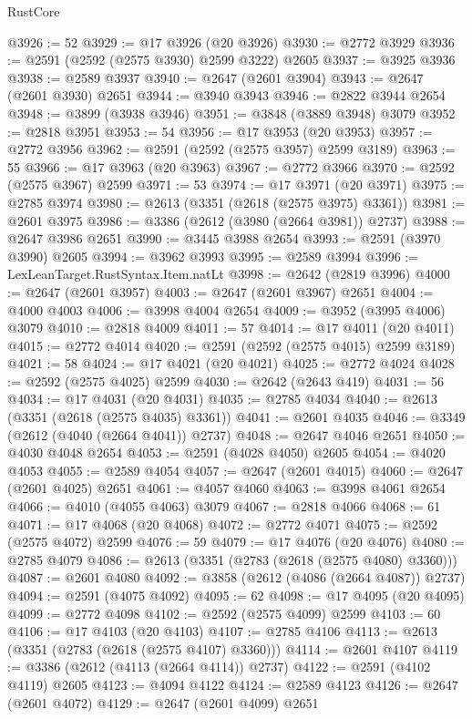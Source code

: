 \begin{lexlean}{RustCore}
\begin{coremodule}
@3926 := 52
@3929 := @17 @3926 (@20 @3926)
@3930 := @2772 @3929
@3936 := @2591 (@2592 (@2575 @3930) @2599 @3222) @2605
@3937 := @3925 @3936
@3938 := @2589 @3937
@3940 := @2647 (@2601 @3904)
@3943 := @2647 (@2601 @3930) @2651
@3944 := @3940 @3943
@3946 := @2822 @3944 @2654
@3948 := @3899 (@3938 @3946)
@3951 := @3848 (@3889 @3948) @3079
@3952 := @2818 @3951
@3953 := 54
@3956 := @17 @3953 (@20 @3953)
@3957 := @2772 @3956
@3962 := @2591 (@2592 (@2575 @3957) @2599 @3189)
@3963 := 55
@3966 := @17 @3963 (@20 @3963)
@3967 := @2772 @3966
@3970 := @2592 (@2575 @3967) @2599
@3971 := 53
@3974 := @17 @3971 (@20 @3971)
@3975 := @2785 @3974
@3980 := @2613 (@3351 (@2618 (@2575 @3975) @3361))
@3981 := @2601 @3975
@3986 := @3386 (@2612 (@3980 (@2664 @3981)) @2737)
@3988 := @2647 @3986 @2651
@3990 := @3445 @3988 @2654
@3993 := @2591 (@3970 @3990) @2605
@3994 := @3962 @3993
@3995 := @2589 @3994
@3996 := LexLeanTarget.RustSyntax.Item.natLt
@3998 := @2642 (@2819 @3996)
@4000 := @2647 (@2601 @3957)
@4003 := @2647 (@2601 @3967) @2651
@4004 := @4000 @4003
@4006 := @3998 @4004 @2654
@4009 := @3952 (@3995 @4006) @3079
@4010 := @2818 @4009
@4011 := 57
@4014 := @17 @4011 (@20 @4011)
@4015 := @2772 @4014
@4020 := @2591 (@2592 (@2575 @4015) @2599 @3189)
@4021 := 58
@4024 := @17 @4021 (@20 @4021)
@4025 := @2772 @4024
@4028 := @2592 (@2575 @4025) @2599
@4030 := @2642 (@2643 @419)
@4031 := 56
@4034 := @17 @4031 (@20 @4031)
@4035 := @2785 @4034
@4040 := @2613 (@3351 (@2618 (@2575 @4035) @3361))
@4041 := @2601 @4035
@4046 := @3349 (@2612 (@4040 (@2664 @4041)) @2737)
@4048 := @2647 @4046 @2651
@4050 := @4030 @4048 @2654
@4053 := @2591 (@4028 @4050) @2605
@4054 := @4020 @4053
@4055 := @2589 @4054
@4057 := @2647 (@2601 @4015)
@4060 := @2647 (@2601 @4025) @2651
@4061 := @4057 @4060
@4063 := @3998 @4061 @2654
@4066 := @4010 (@4055 @4063) @3079
@4067 := @2818 @4066
@4068 := 61
@4071 := @17 @4068 (@20 @4068)
@4072 := @2772 @4071
@4075 := @2592 (@2575 @4072) @2599
@4076 := 59
@4079 := @17 @4076 (@20 @4076)
@4080 := @2785 @4079
@4086 := @2613 (@3351 (@2783 (@2618 (@2575 @4080) @3360)))
@4087 := @2601 @4080
@4092 := @3858 (@2612 (@4086 (@2664 @4087)) @2737)
@4094 := @2591 (@4075 @4092)
@4095 := 62
@4098 := @17 @4095 (@20 @4095)
@4099 := @2772 @4098
@4102 := @2592 (@2575 @4099) @2599
@4103 := 60
@4106 := @17 @4103 (@20 @4103)
@4107 := @2785 @4106
@4113 := @2613 (@3351 (@2783 (@2618 (@2575 @4107) @3360)))
@4114 := @2601 @4107
@4119 := @3386 (@2612 (@4113 (@2664 @4114)) @2737)
@4122 := @2591 (@4102 @4119) @2605
@4123 := @4094 @4122
@4124 := @2589 @4123
@4126 := @2647 (@2601 @4072)
@4129 := @2647 (@2601 @4099) @2651

\end{coremodule}
\end{lexlean}
